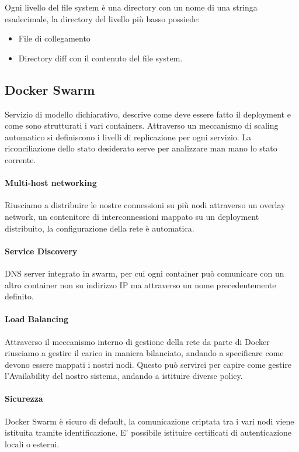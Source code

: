 \documentclass{article}
\begin{document}
		Ogni livello del file system è una directory con un nome di una stringa esadecimale, la directory del livello più basso possiede:
		\begin{itemize}
		    \item File di collegamento
		    \item Directory diff con il contenuto del file system.
		\end{itemize}
		
		\subsection{Docker Swarm}
		Servizio di modello dichiarativo, descrive come deve essere fatto il deployment e come sono strutturati i vari containers.
		Attraverso un meccanismo di scaling automatico si definiscono i livelli di replicazione per ogni servizio.
		La riconciliazione dello stato desiderato serve per analizzare man mano lo stato corrente.\\
		
		\paragraph{Multi-host networking}
		Riusciamo a distribuire le nostre connessioni su più nodi attraverso un overlay network, un contenitore di interconnessioni mappato su un deployment distribuito, la configurazione della rete è automatica.\newline
		
		\paragraph{Service Discovery}
		DNS server integrato in swarm, per cui ogni container può comunicare con un altro container non su indirizzo IP ma attraverso un nome precedentemente definito.\newline
		
		\paragraph{Load Balancing}
		Attraverso il meccanismo interno di gestione della rete da parte di Docker riusciamo a gestire il carico in maniera bilanciato, andando a specificare come devono essere mappati i nostri nodi. Questo può servirci per capire come gestire l'Availability del nostro sistema, andando a istituire diverse policy.\newline
		
		\paragraph{Sicurezza}
		Docker Swarm è sicuro di default, la comunicazione criptata tra i vari nodi viene istituita tramite identificazione. E' possibile istituire certificati di autenticazione locali o esterni. \newline
		
\end{document}
